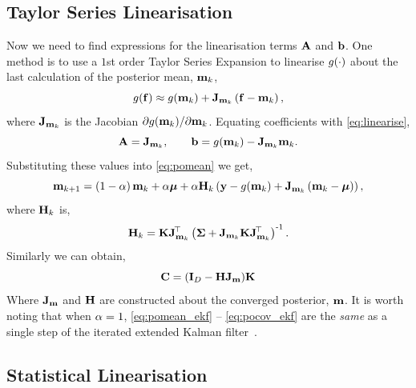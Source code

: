 \documentclass{article} %
\begin{document}
\subsection{Taylor Series Linearisation}

Now we need to find expressions for the linearisation terms $\mathbf{A}$ and
$\mathbf{b}$. One method is to use a $1$st order Taylor Series Expansion to 
linearise $g\!\left({{\cdot}}\right)$ about the last calculation of the posterior mean, 
$\mathbf{m}_k$,
\begin{equation}
    g\!\left({{\mathbf{f}}}\right) \approx g\!\left({{\mathbf{m}_k}}\right) +
    \mathbf{J}_{\mathbf{m}_k}\left({\mathbf{f} - \mathbf{m}_k}\right),
\end{equation}
where $\mathbf{J}_{\mathbf{m}_k}$ is the Jacobian $\partial g\!\left({{\mathbf{m}_k}}\right)\!/ 
\partial\mathbf{m}_k$. Equating coefficients with \eqref{eq:linearise},
\begin{equation}
    \mathbf{A} = \mathbf{J}_{\mathbf{m}_k}, \qquad \mathbf{b} = g\!\left({{\mathbf{m}_k}}\right) -
    \mathbf{J}_{\mathbf{m}_k}\mathbf{m}_k.
\end{equation}
Substituting these values into \eqref{eq:pomean} we get,
\begin{equation}
    \mathbf{m}_{k+1} = \left({1-\alpha}\right)\mathbf{m}_k + \alpha\boldsymbol{\mu} 
        + \alpha\mathbf{H}_k\left({\mathbf{y} - g\!\left({{\mathbf{m}_k}}\right) 
        + \mathbf{J}_{\mathbf{m}_k}\left({\mathbf{m}_k - \boldsymbol{\mu}}\right)}\right),
    \label{eq:pomean_ekf}
\end{equation}
where $\mathbf{H}_k$ is,
\begin{equation}
    \mathbf{H}_k = \mathbf{K}\mathbf{J}_{\mathbf{m}_k}^{\!\top}\left({\boldsymbol{\Sigma} +
        \mathbf{J}_{\mathbf{m}_k}\mathbf{K}\mathbf{J}_{\mathbf{m}_k}^{\!\top}}\right)^{\text{-}1}.
\end{equation}
Similarly we can obtain,
\begin{equation}
    \mathbf{C} = \left({\mathbf{I}_{D} - \mathbf{H}\mathbf{J}_{\mathbf{m}}}\right)\!\mathbf{K}
    \label{eq:pocov_ekf}
\end{equation}
Where $\mathbf{J}_{\mathbf{m}}$ and $\mathbf{H}$ are constructed about the converged
posterior, $\mathbf{m}$. It is worth noting that when $\alpha = 1$,
\eqref{eq:pomean_ekf} -- \eqref{eq:pocov_ekf} are the \emph{same} as a single
step of the iterated extended Kalman filter~\cite{Bell1993, Sibley2006}.


\subsection{Statistical Linearisation}
\end{document}
